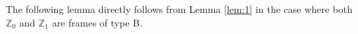 \documentclass[a4paper]{amsart}
\theoremstyle{definition}
\theoremstyle{remark}
\newcommand{\CC}{\mathbb{C}}
\newcommand{\ZZ}{\mathbb{Z}}
\newcommand{\bG}{\overline{G}}
\newcommand{\bX}{Y}
\numberwithin{equation}{section}
\begin{document}

The following lemma directly follows from Lemma \ref{lem:1} in the case where both $\ZZ_0$ and $\ZZ_1$ are frames of type B.
\end{document}
